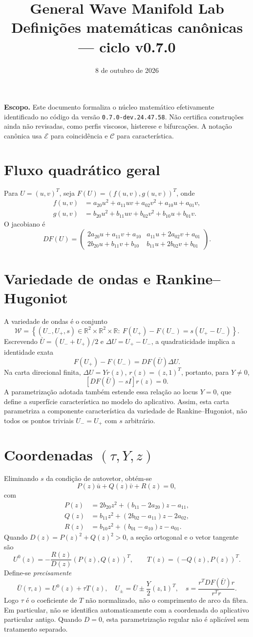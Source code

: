 \documentclass[11pt,a4paper]{article}
\title{General Wave Manifold Lab\\Definições matemáticas canônicas — ciclo v0.7.0}
\date{8 de outubro de 2026}
\begin{document}
\maketitle
\noindent\textbf{Escopo.} Este documento formaliza o núcleo matemático efetivamente identificado no código da versão \texttt{0.7.0-dev.24.47.58}. Não certifica construções ainda não revisadas, como perfis viscosos, histerese e bifurcações. A notação canônica usa $\mathcal E$ para coincidência e $\mathcal C$ para característica.
\section{Fluxo quadrático geral}
Para $U=(u,v)^T$, seja $F(U)=(f(u,v),g(u,v))^T$, onde
\begin{align*}
f(u,v)&=a_{20}u^2+a_{11}uv+a_{02}v^2+a_{10}u+a_{01}v,\\
g(u,v)&=b_{20}u^2+b_{11}uv+b_{02}v^2+b_{10}u+b_{01}v.
\end{align*}
O jacobiano é
\[
DF(U)=\begin{pmatrix}
2a_{20}u+a_{11}v+a_{10}&a_{11}u+2a_{02}v+a_{01}\\
2b_{20}u+b_{11}v+b_{10}&b_{11}u+2b_{02}v+b_{01}
\end{pmatrix}.
\]
\section{Variedade de ondas e Rankine--Hugoniot}
A variedade de ondas é o conjunto
\[
\mathcal W=\left\{(U_-,U_+,s)\in\mathbb R^2\times\mathbb R^2\times\mathbb R:\ F(U_+)-F(U_-)=s(U_+-U_-)\right\}.
\]
Escrevendo $\bar U=(U_-+U_+)/2$ e $\Delta U=U_+-U_-$, a quadraticidade implica a identidade exata
\[
F(U_+)-F(U_-)=DF(\bar U)\Delta U.
\]
Na carta direcional finita, $\Delta U=Y r(z)$, $r(z)=(z,1)^T$, portanto, para $Y\ne0$,
\[
[DF(\bar U)-sI]r(z)=0.
\]
A parametrização adotada também estende essa relação ao locus $Y=0$, que define a superfície característica no modelo do aplicativo. Assim, esta carta parametriza a componente característica da variedade de Rankine--Hugoniot, não todos os pontos triviais $U_-=U_+$ com $s$ arbitrário.
\section{Coordenadas $(\tau,Y,z)$}
Eliminando $s$ da condição de autovetor, obtém-se
\[
P(z)\bar u+Q(z)\bar v+R(z)=0,
\]
com
\begin{align*}
P(z)&=2b_{20}z^2+(b_{11}-2a_{20})z-a_{11},\\
Q(z)&=b_{11}z^2+(2b_{02}-a_{11})z-2a_{02},\\
R(z)&=b_{10}z^2+(b_{01}-a_{10})z-a_{01}.
\end{align*}
Quando $D(z)=P(z)^2+Q(z)^2>0$, a seção ortogonal e o vetor tangente são
\[
U^0(z)=-\frac{R(z)}{D(z)}(P(z),Q(z))^T,\qquad T(z)=(-Q(z),P(z))^T.
\]
Define-se \emph{precisamente}
\[
\boxed{\bar U(\tau,z)=U^0(z)+\tau T(z)},\quad
U_\pm=\bar U\pm\frac Y2(z,1)^T,\quad
s=\frac{r^TDF(\bar U)r}{r^Tr}.
\]
Logo $\tau$ é o coeficiente de $T$ não normalizado, não o comprimento de arco da fibra. Em particular, não se identifica automaticamente com a coordenada do aplicativo particular antigo. Quando $D=0$, esta parametrização regular não é aplicável sem tratamento separado.
\end{document}
